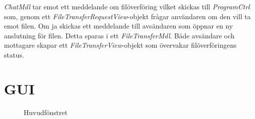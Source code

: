 \documentclass{article}
\begin{document}
\emph{ChatMdl} tar emot ett meddelande om filöverföring vilket skickas till \emph{ProgramCtrl} som, genom ett \emph{FileTransferRequestView}-objekt frågar användaren om den vill ta emot filen. Om ja skickas ett meddelande till avsändaren som öppnar en ny anslutning för filen. Detta sparas i ett \emph{FileTransferMdl}. Både avsändare och mottagare skapar ett \emph{FileTransferView}-objekt som övervakar filöverföringens status.

\section{GUI}

\begin{figure}[h!]
  \caption{Huvudfönstret}
\end{figure}
\end{document}
